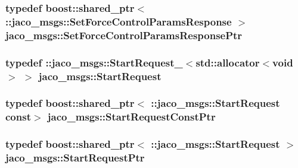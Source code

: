 \subsubsection[{\texorpdfstring{Set\+Force\+Control\+Params\+Response\+Ptr}{SetForceControlParamsResponsePtr}}]{\setlength{\rightskip}{0pt plus 5cm}typedef boost\+::shared\+\_\+ptr$<$ \+::{\bf jaco\+\_\+msgs\+::\+Set\+Force\+Control\+Params\+Response} $>$ {\bf jaco\+\_\+msgs\+::\+Set\+Force\+Control\+Params\+Response\+Ptr}}\hypertarget{namespacejaco__msgs_a037c85054e5e00295f67040ccbace49e}{}\label{namespacejaco__msgs_a037c85054e5e00295f67040ccbace49e}
\subsubsection[{\texorpdfstring{Start\+Request}{StartRequest}}]{\setlength{\rightskip}{0pt plus 5cm}typedef \+::{\bf jaco\+\_\+msgs\+::\+Start\+Request\+\_\+}$<$std\+::allocator$<$void$>$ $>$ {\bf jaco\+\_\+msgs\+::\+Start\+Request}}\hypertarget{namespacejaco__msgs_a967d4b8e4c7fe72a2b13622d4ac5b317}{}\label{namespacejaco__msgs_a967d4b8e4c7fe72a2b13622d4ac5b317}
\subsubsection[{\texorpdfstring{Start\+Request\+Const\+Ptr}{StartRequestConstPtr}}]{\setlength{\rightskip}{0pt plus 5cm}typedef boost\+::shared\+\_\+ptr$<$ \+::{\bf jaco\+\_\+msgs\+::\+Start\+Request} const$>$ {\bf jaco\+\_\+msgs\+::\+Start\+Request\+Const\+Ptr}}\hypertarget{namespacejaco__msgs_afdbcdea38f5a029509c0e584f2a09e65}{}\label{namespacejaco__msgs_afdbcdea38f5a029509c0e584f2a09e65}
\subsubsection[{\texorpdfstring{Start\+Request\+Ptr}{StartRequestPtr}}]{\setlength{\rightskip}{0pt plus 5cm}typedef boost\+::shared\+\_\+ptr$<$ \+::{\bf jaco\+\_\+msgs\+::\+Start\+Request} $>$ {\bf jaco\+\_\+msgs\+::\+Start\+Request\+Ptr}}\hypertarget{namespacejaco__msgs_a98d6ba1c0a72e9842611a1e4daea6570}{}\label{namespacejaco__msgs_a98d6ba1c0a72e9842611a1e4daea6570}
